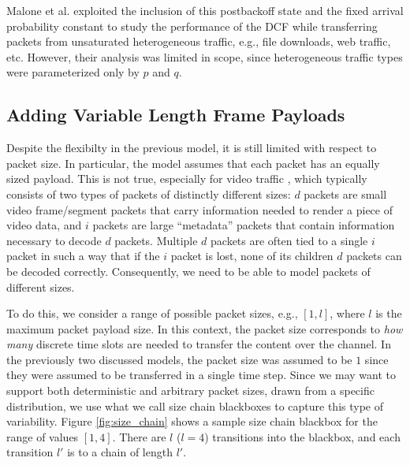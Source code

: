 \documentclass{llncs}
\begin{document}
Malone et al. \cite{dcf-nonsaturated} exploited the inclusion of this postbackoff state and the fixed arrival probability constant to study the performance of the DCF while transferring packets from unsaturated heterogeneous traffic, e.g., file downloads, web traffic, etc. However, their analysis was limited in scope, since heterogeneous traffic types were parameterized only by $p$ and $q$.

\subsection{Adding Variable Length Frame Payloads}
Despite the flexibilty in the previous model, it is still limited with respect to packet size. In particular, the model assumes that each packet has an equally sized payload. This is not true, especially for video traffic \cite{badia2010markov}, which typically consists of two types of packets of distinctly different sizes: $d$ packets are small video frame/segment packets that carry information needed to render a piece of video data, and $i$ packets are large ``metadata'' packets that contain information necessary to decode $d$ packets. Multiple $d$ packets are often tied to a single $i$ packet in such a way that if the $i$ packet is lost, none of its children $d$ packets can be decoded correctly. Consequently, we need to be able to model packets of different sizes. 

To do this, we consider a range of possible packet sizes, e.g., $[1,l]$, where $l$ is the maximum packet payload size. In this context, the packet size corresponds to \emph{how many} discrete time slots are needed to transfer the content over the channel. In the previously two discussed models, the packet size was assumed to be $1$ since they were assumed to be transferred in a single time step. Since we may want to support both deterministic and arbitrary packet sizes, drawn from a specific distribution, we use what we call size chain blackboxes to capture this type of variability. Figure \ref{fig:size_chain} shows a sample size chain blackbox for the range of values $[1,4]$. There are $l$ ($l = 4$) transitions into the blackbox, and each transition $l'$ is to a chain of length $l'$. 
\end{document}
